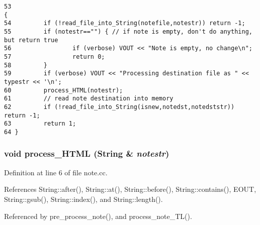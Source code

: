 \footnotesize\begin{verbatim}53                                                                                                                            {
54         if (!read_file_into_String(notefile,notestr)) return -1;
55         if (notestr=="") { // if note is empty, don't do anything, but return true
56                 if (verbose) VOUT << "Note is empty, no change\n";
57                 return 0;
58         }
59         if (verbose) VOUT << "Processing destination file as " << typestr << '\n';
60         process_HTML(notestr);
61         // read note destination into memory
62         if (!read_file_into_String(isnew,notedst,notedststr)) return -1;
63         return 1;
64 }
\end{verbatim}\normalsize 
{}
\subsubsection{\setlength{\rightskip}{0pt plus 5cm}void process\_\-HTML ({\bf String} \& {\em notestr})}\label{note_8cc_a0}




Definition at line 6 of file note.cc.

References String::after(), String::at(), String::before(), String::contains(), EOUT, String::gsub(), String::index(), and String::length().

Referenced by pre\_\-process\_\-note(), and process\_\-note\_\-TL().



